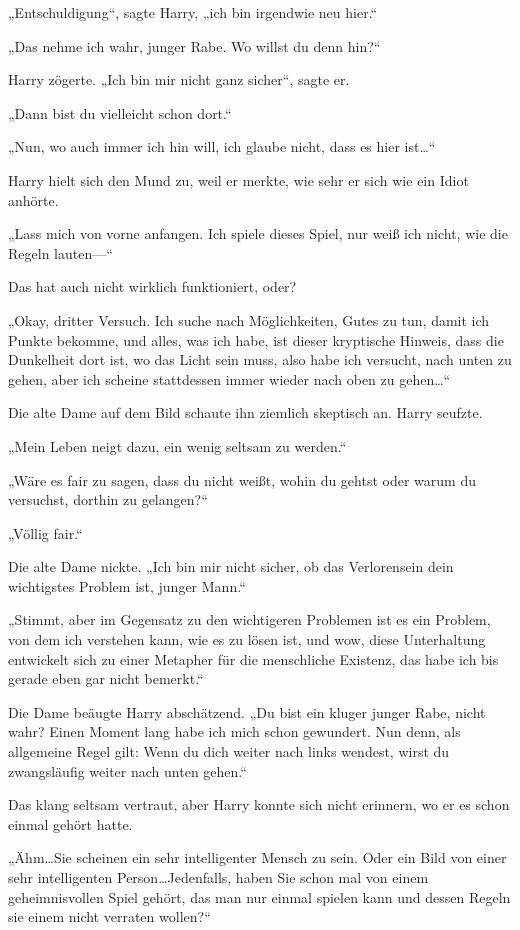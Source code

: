 {„Entschuldigung“, sagte Harry, „ich bin irgendwie neu hier.“

„Das nehme ich wahr, junger Rabe. Wo willst du denn hin?“

Harry zögerte. „Ich bin mir nicht ganz sicher“, sagte er.

„Dann bist du vielleicht schon dort.“

„Nun, wo auch immer ich hin will, ich glaube nicht, dass es hier ist…“

Harry hielt sich den Mund zu, weil er merkte, wie sehr er sich wie ein Idiot anhörte.

„Lass mich von vorne anfangen. Ich spiele dieses Spiel, nur weiß ich nicht, wie die Regeln lauten—“

Das hat auch nicht wirklich funktioniert, oder?

„Okay, dritter Versuch. Ich suche nach Möglichkeiten, Gutes zu tun, damit ich Punkte bekomme, und alles, was ich habe, ist dieser kryptische Hinweis, dass die Dunkelheit dort ist, wo das Licht sein muss, also habe ich versucht, nach unten zu gehen, aber ich scheine stattdessen immer wieder nach oben zu gehen…“

Die alte Dame auf dem Bild schaute ihn ziemlich skeptisch an. Harry seufzte.

„Mein Leben neigt dazu, ein wenig seltsam zu werden.“

„Wäre es fair zu sagen, dass du nicht weißt, wohin du gehtst oder warum du versuchst, dorthin zu gelangen?“

„Völlig fair.“

Die alte Dame nickte. „Ich bin mir nicht sicher, ob das Verlorensein dein wichtigstes Problem ist, junger Mann.“

„Stimmt, aber im Gegensatz zu den wichtigeren Problemen ist es ein Problem, von dem ich verstehen kann, wie es zu lösen ist, und wow, diese Unterhaltung entwickelt sich zu einer Metapher für die menschliche Existenz, das habe ich bis gerade eben gar nicht bemerkt.“

Die Dame beäugte Harry abschätzend. „Du bist ein kluger junger Rabe, nicht wahr? Einen Moment lang habe ich mich schon gewundert. Nun denn, als allgemeine Regel gilt: Wenn du dich weiter nach links wendest, wirst du zwangsläufig weiter nach unten gehen.“

Das klang seltsam vertraut, aber Harry konnte sich nicht erinnern, wo er es schon einmal gehört hatte.

„Ähm…Sie scheinen ein sehr intelligenter Mensch zu sein. Oder ein Bild von einer sehr intelligenten Person…Jedenfalls, haben Sie schon mal von einem geheimnisvollen Spiel gehört, das man nur einmal spielen kann und dessen Regeln sie einem nicht verraten wollen?“

}
